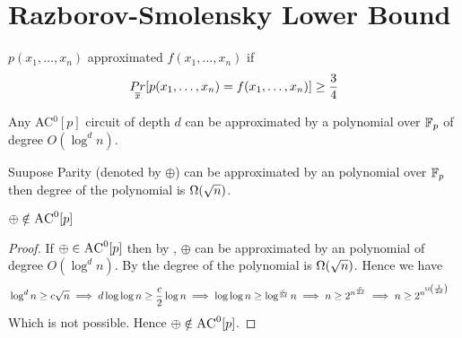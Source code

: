\section{Razborov-Smolensky Lower Bound}
\begin{definition}
    $p(x_1,\dots, x_n)$ approximated $f(x_1,\dots, x_n)$ if \[
         \underset{\overline{x}}{Pr}[p(x_1,\dots,x_n)=f(x_1,\dots, x_n)]\geq \frac34
    \]
    
\end{definition}
\begin{lemma}\label{ac0p-poly-degree-ub}
    Any \textsc{AC}$^0[p]$ circuit of depth $d$ can be approximated by a polynomial over $\mathbb{F}_p$ of degree $O(\log^d n)$.
\end{lemma}

\begin{lemma}\label{parity-poly-degree-lb}
    Suupose Parity (denoted by $\oplus$) can be approximated by an polynomial over $\mathbb{F}_p$ then degree of the polynomial is $\Omega(\sqrt{n})$.
\end{lemma}


\begin{theorem}
$\oplus\notin \textsc{AC}^0[p]$
\end{theorem}
\begin{proof}
     If $\oplus\in \textsc{AC}^0[p]$ then by , $\oplus$ can be approximated by an polynomial of degree $O(\log^d n)$. By  the degree of the polynomial is $\Omega(\sqrt{n})$. Hence we have \begin{align*}
     & \log^dn\geq c\sqrt{n}\implies d\log\log n\geq \frac{c}2\log n\implies \log\log n \geq \log^{\frac{c}{2d}}n\implies n\geq 2^{n^{\frac{c}{2d}}}\implies n\geq 2^{n^{\Omega\left(\frac1{2d}\right)}}
     \end{align*}Which is not possible. Hence $\oplus\notin \textsc{AC}^0[p]$.
\end{proof}